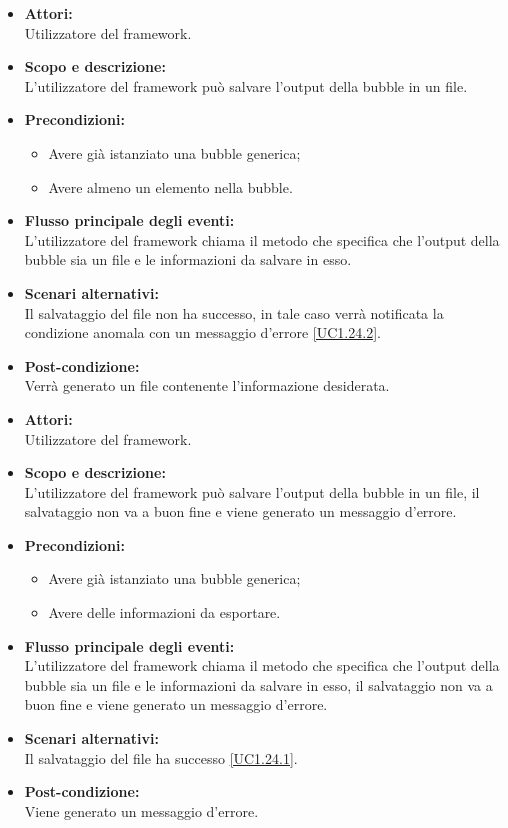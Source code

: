 \begin{itemize}
	\item \textbf{Attori:}
	\\Utilizzatore del framework.
	\item \textbf{Scopo e descrizione:} 
	\\L'utilizzatore del framework può salvare l'output della bubble in un file.
	\item \textbf{Precondizioni:}
	\begin{itemize}
		\item Avere già istanziato una bubble generica;
		\item Avere almeno un elemento nella bubble.
	\end{itemize}
	\item \textbf{Flusso principale degli eventi:}
	\\L'utilizzatore del framework chiama il metodo che specifica che l'output della bubble sia un file e le informazioni da salvare in esso.
	\item \textbf{Scenari alternativi:}
	\\Il salvataggio del file non ha successo, in tale caso verrà notificata la condizione anomala con un messaggio d'errore \ref{UC1.24.2}.
	\item \textbf{Post-condizione:}
	\\Verrà generato un file contenente l'informazione desiderata.
\end{itemize}


\begin{itemize}
	\item \textbf{Attori:}
	\\Utilizzatore del framework.
	\item \textbf{Scopo e descrizione:} 
	\\L'utilizzatore del framework può salvare l'output della bubble in un file, il salvataggio non va a buon fine e viene generato un messaggio d'errore.
	\item \textbf{Precondizioni:}
	\begin{itemize}
		\item Avere già istanziato una bubble generica;
		\item Avere delle informazioni da esportare.
	\end{itemize}
	\item \textbf{Flusso principale degli eventi:}
	\\L'utilizzatore del framework chiama il metodo che specifica che l'output della bubble sia un file e le informazioni da salvare in esso, il salvataggio non va a buon fine e viene generato un messaggio d'errore.
	\item \textbf{Scenari alternativi:}
	\\Il salvataggio del file ha successo \ref{UC1.24.1}.
	\item \textbf{Post-condizione:}
	\\Viene generato un messaggio d'errore.
\end{itemize}

